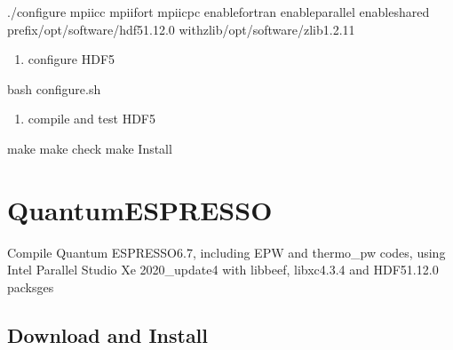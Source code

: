 \documentclass[a4paper,12pt,english]{sphinxmanual}
\begin{document}
\begin{sphinxVerbatim}[commandchars=\\\{\}]

    ./configure mpiicc mpiifort mpiicpc 
    \PYGZhy{}\PYGZhy{}enable\PYGZhy{}fortran 
    \PYGZhy{}\PYGZhy{}enable\PYGZhy{}parallel 
    \PYGZhy{}\PYGZhy{}enable\PYGZhy{}shared 
    \PYGZhy{}\PYGZhy{}prefix/opt/software/hdf5\PYGZhy{}1.12.0 
    \PYGZhy{}\PYGZhy{}with\PYGZhy{}zlib/opt/software/zlib\PYGZhy{}1.2.11
\end{sphinxVerbatim}
\begin{enumerate}
%
\setcounter{enumi}{1}
\item {} 
\sphinxAtStartPar
configure HDF5

\end{enumerate}

\begin{sphinxVerbatim}[commandchars=\\\{\}]
bash configure.sh
\end{sphinxVerbatim}
\begin{enumerate}
%
\setcounter{enumi}{2}
\item {} 
\sphinxAtStartPar
compile and test HDF5

\end{enumerate}

\begin{sphinxVerbatim}[commandchars=\\\{\}]
make  make check  make Install
\end{sphinxVerbatim}


\section{Quantum\sphinxhyphen{}ESPRESSO}
\label{\detokenize{compile:quantum-espresso}}
\sphinxAtStartPar
Compile Quantum ESPRESSO\sphinxhyphen{}6.7, including EPW and thermo\_pw codes, using Intel Parallel Studio Xe 2020\_update4 with libbeef, libxc\sphinxhyphen{}4.3.4 and HDF5\sphinxhyphen{}1.12.0 packsges


\subsection{Download and Install}
\label{\detokenize{compile/Quantum-ESPRESSO_6.7:download-and-install}}\label{\detokenize{compile/Quantum-ESPRESSO_6.7::doc}}
\end{document}
